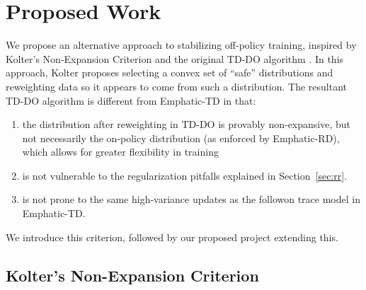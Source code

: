 \documentclass[11pt]{article}
\begin{document}
\section{Proposed Work}
We propose an alternative approach to stabilizing off-policy training, inspired by Kolter's Non-Expansion Criterion and the original TD-DO algorithm \cite{kolter2011fixed}. 
In this approach, Kolter proposes selecting a convex set of ``safe'' distributions and reweighting data so it appears to come from such a distribution. The resultant TD-DO algorithm is different from Emphatic-TD in that:
\begin{enumerate}
  \item the distribution after reweighting in TD-DO is provably non-expansive, but not necessarily the on-policy distribution (as enforced by Emphatic-RD), which allows for greater flexibility in training
  \item is not vulnerable to the regularization pitfalls explained in Section~\ref{sec:rr}.
  \item is not prone to the same high-variance updates as the followon trace model in Emphatic-TD.
\end{enumerate}
We introduce this criterion, followed by our proposed project extending this.

\subsection{Kolter's Non-Expansion Criterion }
\end{document}
